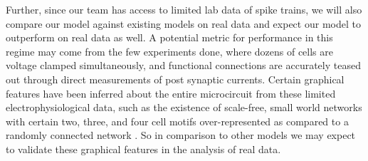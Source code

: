 \documentclass{article}
\begin{document}
Further, since our team has access to limited lab data of spike trains, we will also compare our model against existing models on real data and expect our model to outperform on real data as well.  A potential metric for performance in this regime may come from the few experiments done, where dozens of cells are voltage clamped simultaneously, and functional connections are accurately teased out through direct measurements of post synaptic currents.  Certain graphical features have been inferred about the entire microcircuit from these limited electrophysiological data, such as the existence of scale-free, small world networks with certain two, three, and four cell motifs over-represented as compared to a randomly connected network \citep{song2005,perin2011}.  So in comparison to other models we may expect to validate these graphical features in the analysis of real data.

\begin{small}

 
\end{small}
\end{document}
